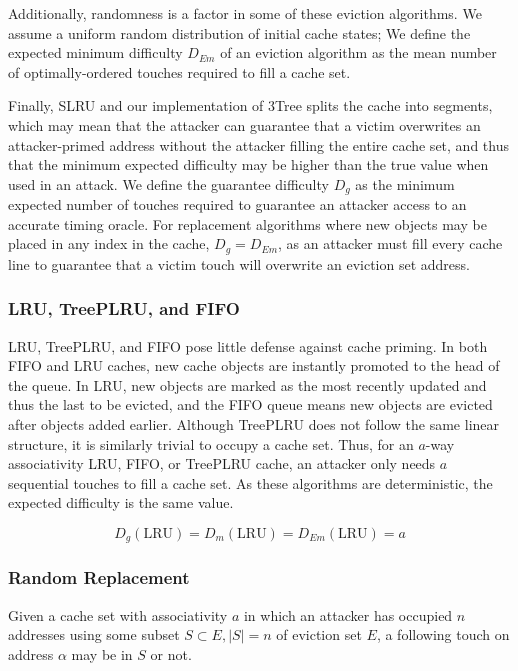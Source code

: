 \documentclass[letterpaper, twocolumn]{article}
\begin{document}
Additionally, randomness is a factor in some of these eviction algorithms.
We assume a uniform random distribution of initial cache states;
We define the expected minimum difficulty $D_{Em}$ of an eviction algorithm
as the mean number of optimally-ordered touches required to fill a cache set.

Finally, SLRU and our implementation of 3Tree splits the cache into segments,
which may mean that the attacker can guarantee that a victim overwrites
an attacker-primed address without the attacker filling the entire cache set,
and thus that the minimum expected difficulty may be higher than the true value
when used in an attack.
We define the guarantee difficulty $D_g$ as the minimum expected number of touches
required to guarantee an attacker access to an accurate timing oracle.
For replacement algorithms where new objects may be placed in any index in the cache,
$D_g = D_{Em}$, as an attacker must fill every cache line to guarantee
that a victim touch will overwrite an eviction set address.

\subsubsection{LRU, TreePLRU, and FIFO}
LRU, TreePLRU, and FIFO pose little defense against cache priming.
In both FIFO and LRU caches, new cache objects are instantly promoted to the head of the queue.
In LRU, new objects are marked as the most recently updated and thus the last to be evicted,
and the FIFO queue means new objects are evicted after objects added earlier.
Although TreePLRU does not follow the same linear structure,
it is similarly trivial to occupy a cache set.
Thus, for an $a$-way associativity LRU, FIFO, or TreePLRU cache, an attacker only needs
$a$ sequential touches to fill a cache set.
As these algorithms are deterministic, the expected difficulty is the same value.

\begin{equation}\label{LRUExpectedD}
  D_g(\text{LRU}) = D_m(\text{LRU}) = D_{Em}(\text{LRU}) = a
\end{equation}

\subsubsection{Random Replacement}
Given a cache set with associativity $a$ in which an attacker has occupied $n$ addresses
using some subset $S \subset E, |S| = n$ of eviction set $E$,
a following touch on address $\alpha$ may be in $S$ or not.
\end{document}
